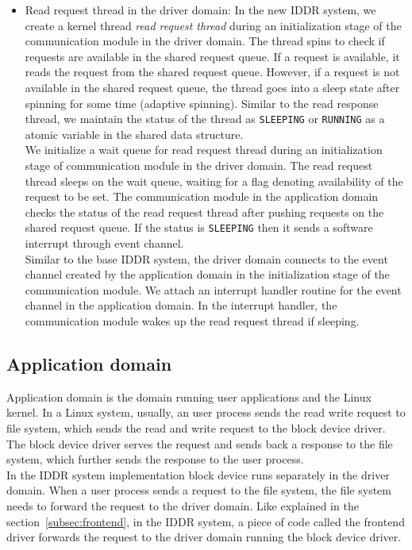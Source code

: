 \begin{itemize}
\item Read request thread in the driver domain:
In the new IDDR system, we create a kernel thread \textit{read request thread} during an initialization stage of the communication module in the driver domain. The thread spins to check if requests are available in the shared request queue. If a request is available, it reads the request from the shared request queue. However, if a request is not available in the shared request queue, the thread goes into a sleep state after spinning for some time (adaptive spinning). Similar to the read response thread, we maintain the status of the thread as \texttt{SLEEPING} or \texttt{RUNNING} as a atomic variable in the shared data structure. 
\\[3mm]
We initialize a wait queue for read request thread during an initialization stage of communication module in the driver domain. The read request thread sleeps on the wait queue, waiting for a flag denoting availability of the request to be set. The communication module in the application domain checks the status of the read request thread after pushing requests on the shared request queue. If the status is \texttt{SLEEPING} then it sends a software interrupt through event channel.
\\[3mm]
Similar to the base IDDR system, the driver domain connects to the event channel created by the application domain in the initialization stage of the communication module. We attach an interrupt handler routine for the event channel in the application domain. In the interrupt handler, the communication module wakes up the read request thread if sleeping. 
\end{itemize}

\subsection{Application domain}

Application domain is the domain running user applications and the Linux kernel. In a Linux system, usually, an user process sends the read write request to file system, which sends the read and write request to the block device driver. The block device driver serves the request and sends back a response to the file system, which further sends the response to the user process. 
\\[3mm]
In the IDDR system implementation block device runs separately in the driver domain. When a user process sends a request to the file system, the file system needs to forward the request to the driver domain. Like explained in the section~\ref{subsec:frontend}, in the IDDR system, a piece of code called the frontend driver forwards the request to the driver domain running the block device driver. 

